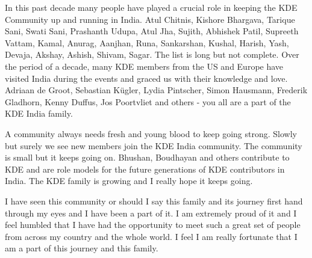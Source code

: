 In this past decade many people have played a crucial role in keeping the KDE Community up and running in India. Atul Chitnis, Kishore Bhargava, Tarique Sani, Swati Sani, Prashanth Udupa, Atul Jha, Sujith, Abhishek Patil, Supreeth Vattam, Kamal, Anurag, Aanjhan, Runa, Sankarshan, Kushal, Harish, Yash, Devaja, Akshay, Ashish, Shivam, Sagar. The list is long but not complete. Over the period of a decade, many KDE members from the US and Europe have visited India during the events and graced us with their knowledge and love. Adriaan de Groot, Sebastian K\"{u}gler, Lydia Pintscher, Simon Hausmann, Frederik Gladhorn, Kenny Duffus, Jos Poortvliet and others - you all are a part of the KDE India family.

A community always needs fresh and young blood to keep going strong. Slowly but surely we see new members join the KDE India community. The community is small but it keeps going on. Bhushan, Boudhayan and others contribute to KDE and are role models for the future generations of KDE contributors in India. The KDE family is growing and I really hope it keeps going.

I have seen this community or should I say this family and its journey first hand through my eyes and I have been a part of it. I am extremely proud of it and I feel humbled that I have had the opportunity to meet such a great set of people from across my country and the whole world. I feel I am really fortunate that I am a part of this journey and this family.

